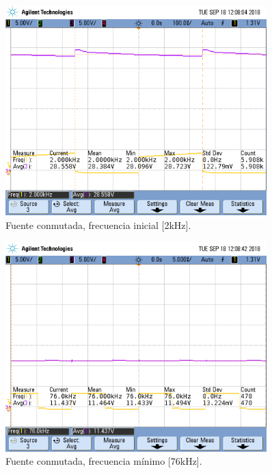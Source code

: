 \begin{figure}[H]
	\centering
	\includegraphics[width=0.9\textwidth]{Imagenes/tp3_labo3.png}
\caption{Fuente conmutada, frecuencia inicial [2kHz].}
	\label{fig:fcon}
\end{figure}

\begin{figure}[H]
	\centering
	\includegraphics[width=0.9\textwidth]{Imagenes/tp3_labo4.png}
\caption{Fuente conmutada, frecuencia mínimo [76kHz].}
	\label{fig:fcon}
\end{figure}

